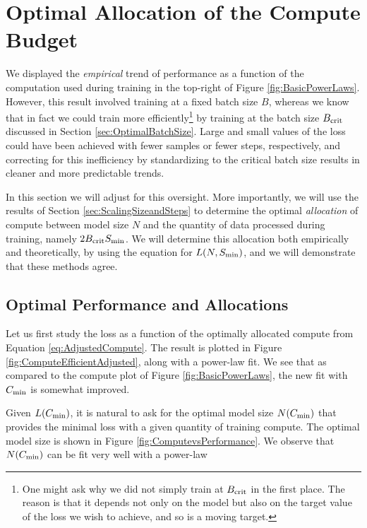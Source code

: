 \section{Optimal Allocation of the Compute Budget}
\label{sec:OptimalCompute}

We displayed the \emph{empirical} trend of performance as a function of the computation used during training in the top-right of Figure \ref{fig:BasicPowerLaws}.  However, this result involved training at a fixed batch size $B$, whereas we know that in fact we could train more efficiently\footnote{One might ask why we did not simply train at $B_{\rm crit}$ in the first place.  The reason is that it depends not only on the model but also on the target value of the loss we wish to achieve, and so is a moving target.} by training at the batch size $B_{\rm crit}$ discussed in Section \ref{sec:OptimalBatchSize}. Large and small values of the loss could have been achieved with fewer samples or fewer steps, respectively, and correcting for this inefficiency by standardizing to the critical batch size results in cleaner and more predictable trends.

In this section we will adjust for this oversight. More importantly, we will use the results of Section \ref{sec:ScalingSizeandSteps} to determine the optimal \emph{allocation} of compute between model size $N$ and the quantity of data processed during training, namely $2 B_{\rm crit}  S_{\rm min}$.  We will determine this allocation both empirically and theoretically, by using the equation for $L(N, S_{\rm min})$, and we will demonstrate that these methods agree.

\subsection{Optimal Performance and Allocations}

Let us first study the loss as a function of the optimally allocated compute from Equation \eqref{eq:AdjustedCompute}.  The result is plotted in Figure \ref{fig:ComputeEfficientAdjusted}, along with a power-law fit.  We see that as compared to the compute plot of Figure \ref{fig:BasicPowerLaws}, the new fit with $C_{\rm min}$ is somewhat improved.  

Given $L(C_{\rm min})$, it is natural to ask for the optimal model size $N(C_{\rm min})$ that provides the minimal loss with a given quantity of training compute.  The optimal model size is shown in Figure \ref{fig:ComputevsPerformance}.  We observe that $N(C_{\rm min})$ can be fit very well with a power-law

